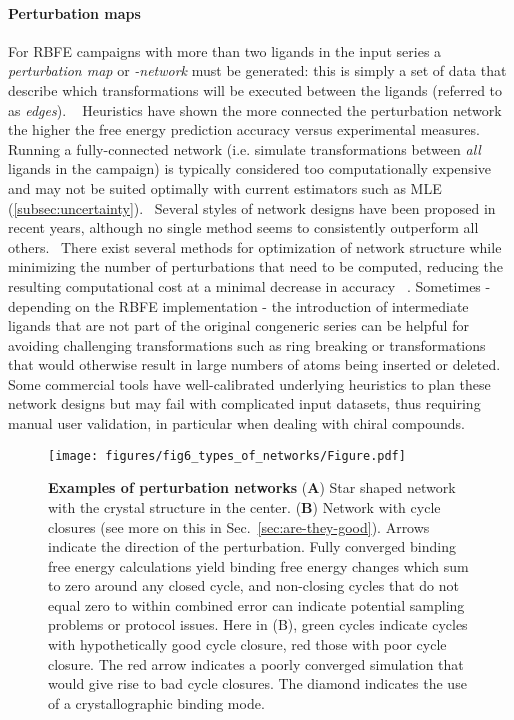 \documentclass[9pt,bestpractices,pubversion]{livecoms}
\begin{document}
\paragraph{Perturbation maps}
For RBFE campaigns with more than two ligands in the input series a \textit{perturbation map} or \textit{-network} must be generated: this is simply a set of data that describe which transformations will be executed between the ligands (referred to as \textit{edges}). ~\cite{liu2013lead} Heuristics have shown the more connected the perturbation network the higher the free energy prediction accuracy versus experimental measures. Running a fully-connected network (i.e. simulate transformations between \textit{all} ligands in the campaign) is typically considered too computationally expensive and may not be suited optimally with current estimators such as MLE (\ref{subsec:uncertainty}).~\cite{scheen22data} Several styles of network designs have been proposed in recent years, although no single method seems to consistently outperform all others.~\cite{ries2024Konnektor} There exist several methods for optimization of network structure while minimizing the number of perturbations that need to be computed, reducing the resulting computational cost at a minimal decrease in accuracy ~\cite{yang2020optimal,xu2019optimal,Pitman2023HiMap}. Sometimes - depending on the RBFE implementation - the introduction of intermediate ligands that are not part of the original congeneric series can be helpful for avoiding challenging transformations such as ring breaking or transformations that would otherwise result in large numbers of atoms being inserted or deleted.~\cite{schoenmaker2025imerge} Some commercial tools have well-calibrated underlying heuristics to plan these network designs but may fail with complicated input datasets, thus requiring manual user validation, in particular when dealing with chiral compounds. 

\begin{figure}
    \texttt{[image: figures/fig6\_types\_of\_networks/Figure.pdf]}
    \caption{\textbf{Examples of perturbation networks} (\textbf{A}) Star shaped network with the crystal structure in the center. (\textbf{B}) Network with cycle closures (see more on this in Sec.~\ref{sec:are-they-good}). Arrows indicate the direction of the perturbation. Fully converged binding free energy calculations yield binding free energy changes which sum to zero around any closed cycle, and non-closing cycles that do not equal zero to within combined error can indicate potential sampling problems or protocol issues. Here in (B), green cycles indicate cycles with hypothetically good cycle closure, red those with poor cycle closure. The red arrow indicates a poorly converged simulation that would give rise to bad cycle closures. The diamond indicates the use of a crystallographic binding mode.}
    \label{fig:fig_types_of_networks}
\end{figure} 
\end{document}
